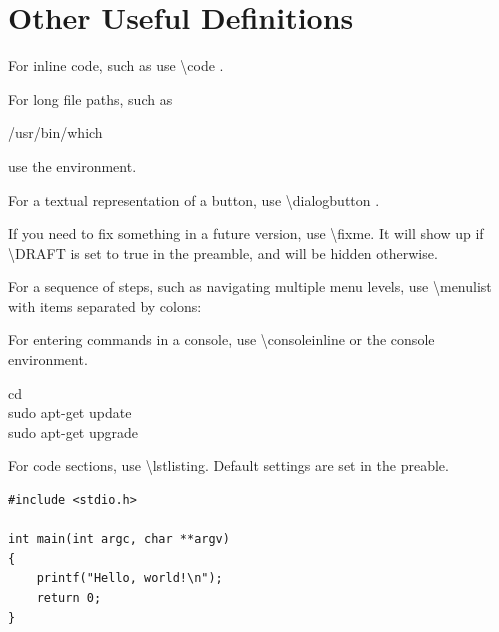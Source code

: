 \section{Other Useful Definitions}
For inline code, such as  use \textbackslash code .

For long file paths, such as
    \begin{longpath}
    /usr/bin/which
    \end{longpath}
use the  environment.

For a textual representation of a button, use \textbackslash dialogbutton . 

If you need to fix something in a future version, use \textbackslash fixme. It will show up if \textbackslash DRAFT is set to true in the preamble, and will be hidden otherwise. 

For a sequence of steps, such as navigating multiple menu levels, use \textbackslash menulist with items separated by colons:

For entering commands in a console, use \textbackslash consoleinline or the console environment.
\begin{console}
cd\\
sudo apt-get update\\
sudo apt-get upgrade\\
\end{console}


For code sections, use \textbackslash lstlisting. Default settings are set in the preable.
\begin{lstlisting}
#include <stdio.h>

int main(int argc, char **argv)
{
    printf("Hello, world!\n");
    return 0;
}\end{lstlisting}